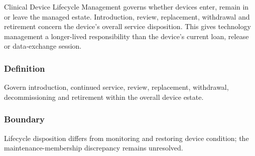 Clinical Device Lifecycle Management governs whether devices enter, remain in or leave the managed estate. Introduction, review, replacement, withdrawal and retirement concern the device's overall service disposition. This gives technology management a longer-lived responsibility than the device's current loan, release or data-exchange session.

\subsubsection*{Definition}

Govern introduction, continued service, review, replacement, withdrawal, decommissioning and retirement within the overall device estate.

\subsubsection*{Boundary}

Lifecycle disposition differs from monitoring and restoring device condition; the maintenance-membership discrepancy remains unresolved.

